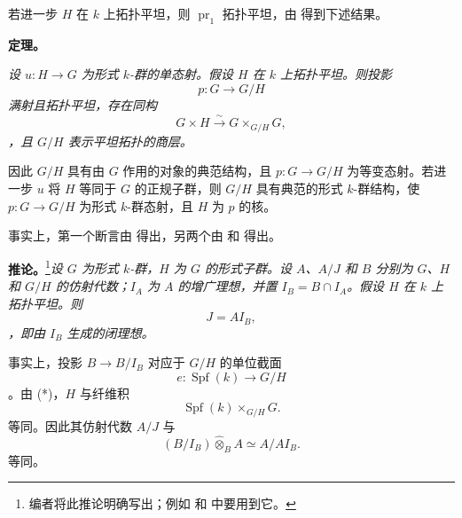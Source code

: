若进一步 \(H\) 在 \(k\) 上拓扑平坦，则 \(\operatorname{pr}_1\) 拓扑平坦，由  得到下述结果。

\medskip\noindent\textbf{定理。} \label{sga3:VIIB:2.4:theorem}{\itshape 设 \(u:H\to G\) 为形式 \(k\)-群的单态射。假设 \(H\) 在 \(k\) 上拓扑平坦。则投影 \[
  p:G\longrightarrow G/H
\] 满射且拓扑平坦，存在同构 \[
  G\times H
  \xrightarrow{\ \sim\ }
  G\times_{G/H}G,
  \tag{*}\label{sga3:VIIB:2.4:equation:quotient-fiber-product-star}
\]，且 \(G/H\) 表示平坦拓扑的商层。

因此 \(G/H\) 具有由 \(G\) 作用的对象的典范结构，且 \(p:G\to G/H\) 为等变态射。若进一步 \(u\) 将 \(H\) 等同于 \(G\) 的正规子群，则 \(G/H\) 具有典范的形式 \(k\)-群结构，使 \(p:G\to G/H\) 为形式 \(k\)-群态射，且 \(H\) 为 \(p\) 的核。}

事实上，第一个断言由  得出，另两个由  和  得出。

\medskip\noindent\textbf{推论。} \label{sga3:VIIB:2.4:corollary}\footnote{\label{sga3:VIIB:nde:91}编者将此推论明确写出；例如  和  中要用到它。}{\itshape 设 \(G\) 为形式 \(k\)-群，\(H\) 为 \(G\) 的形式子群。设 \(A\)、\(A/J\) 和 \(B\) 分别为 \(G\)、\(H\) 和 \(G/H\) 的仿射代数；\(I_A\) 为 \(A\) 的增广理想，并置 \(I_B=B\cap I_A\)。假设 \(H\) 在 \(k\) 上拓扑平坦。则 \[
  J=AI_B,
\]，即由 \(I_B\) 生成的闭理想。}

事实上，投影 \(B\to B/I_B\) 对应于 \(G/H\) 的单位截面 \[
  e:\operatorname{Spf}(k)\longrightarrow G/H
\]。由 \textup{(*)}，\(H\) 与纤维积 \[
  \operatorname{Spf}(k)\times_{G/H}G.
\] 等同。因此其仿射代数 \(A/J\) 与 \[
  (B/I_B)\widehat\otimes_BA
  \simeq
  A/AI_B.
\] 等同。
